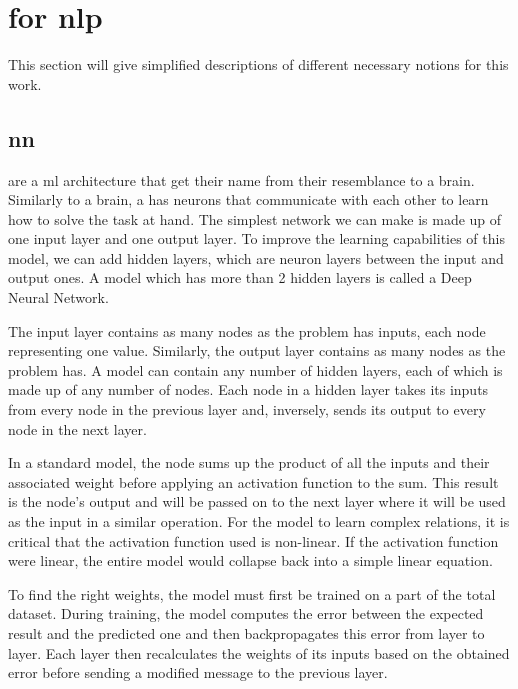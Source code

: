 \documentclass[../Document.tex]{subfiles}
\begin{document}
\section{ for \acrlong{nlp}}
\label{sec:intro/nlp}

This section will give simplified descriptions of different necessary notions for this work.


\subsection{\acrlong{nn}}

 are a \acrlong{ml} architecture that get their name from their resemblance to a brain. Similarly to a brain, a \nn has neurons that communicate with each other to learn how to solve the task at hand. The simplest network we can make is made up of one input layer and one output layer. To improve the learning capabilities of this model, we can add hidden layers, which are neuron layers between the input and output ones. A model which has more than 2 hidden layers is called a Deep Neural Network.

The input layer contains as many nodes as the problem has inputs, each node representing one value. Similarly, the output layer contains as many nodes as the problem has.
A model can contain any number of hidden layers, each of which is made up of any number of nodes. Each node in a hidden layer takes its inputs from every node in the previous layer and, inversely, sends its output to every node in the next layer.

In a standard model, the node sums up the product of all the inputs and their associated weight before applying an activation function to the sum. This result is the node's output and will be passed on to the next layer where it will be used as the input in a similar operation.
For the model to learn complex relations, it is critical that the activation function used is non-linear. If the activation function were linear, the entire model would collapse back into a simple linear equation.

To find the right weights, the model must first be trained on a part of the total dataset. During training, the model computes the error between the expected result and the predicted one and then backpropagates this error from layer to layer. Each layer then recalculates the weights of its inputs based on the obtained error before sending a modified message to the previous layer.
\end{document}
